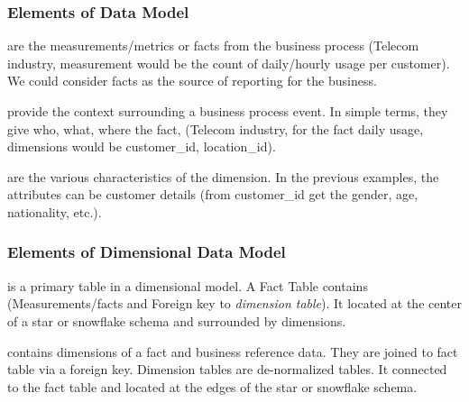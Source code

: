 \begin{frame}
    \frametitle{Elements of Data Model}
    \begin{description}[<+->]
        \item[Facts] are the measurements/metrics or facts from the business process \forexample (Telecom industry, measurement would be the count of daily/hourly usage per customer). We could consider facts as the source of reporting for the business.
        \item[Dimensions] provide the context surrounding a business process event. In simple terms, they give who, what, where the fact, \forexample (Telecom industry, for the fact daily usage, dimensions would be customer\_id, location\_id).
        
        \item[Attributes] are the various characteristics of the dimension. In the previous examples, the attributes can be customer details (from customer\_id get the gender, age, nationality, etc.).
    \end{description}
\end{frame}

\begin{frame}
    \frametitle{Elements of Dimensional Data Model}
    \begin{description}[<+->]
        \item[Fact Table] is a primary table in a dimensional model. A Fact Table contains (Measurements/facts and Foreign key to \textit{dimension table}). It located at the center of a star or snowflake schema and surrounded by dimensions.
        \item[Dimension table] contains dimensions of a fact and business reference data. They are joined to fact table via a foreign key. Dimension tables are de-normalized tables. It connected to the fact table and located at the edges of the star or snowflake schema.

    \end{description}
\end{frame}

